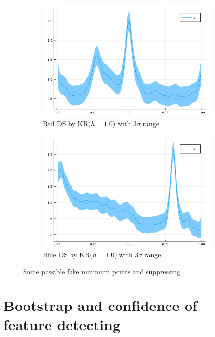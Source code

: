 \documentclass{article}
\begin{document}
\begin{figure}[htb]
  \begin{subfigure}[b]{0.24\linewidth}
    \includegraphics[width=\linewidth]{images/kde_reg_r.png}
    \caption{Red DS by KR($h=1.0$) with 3$\sigma$ range}
  \end{subfigure}
  \begin{subfigure}[b]{0.24\linewidth}
    \includegraphics[width=\linewidth]{images/kde_reg_b.png}
    \caption{Blue DS by KR($h=1.0$) with 3$\sigma$ range}
  \end{subfigure}
  \caption{Some possible fake minimum points and suppressing}
  \label{fig:DS_REG}
\end{figure}


\section{Bootstrap and confidence of feature detecting}
\end{document}
